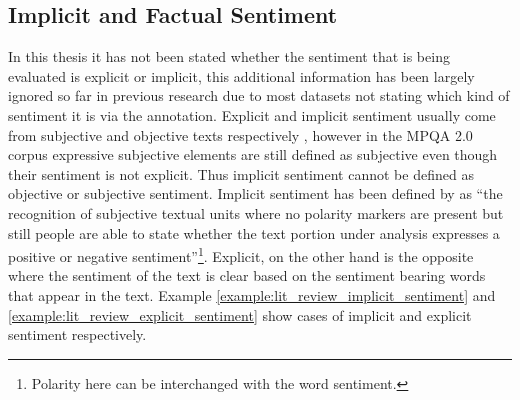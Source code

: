 
%
\subsection{Implicit and Factual Sentiment}
\label{lit_review_further_related_topics_implicit_and_factual_Sentiment}
In this thesis it has not been stated whether the sentiment that is being evaluated is explicit or implicit, this additional information has been largely ignored so far in previous research due to most datasets not stating which kind of sentiment it is via the annotation. Explicit and implicit sentiment usually come from subjective and objective texts respectively \citep{toprak-etal-2010-sentence, van2015good}, however in the MPQA 2.0 corpus \citep{wiebe2005annotating} expressive subjective elements are still defined as subjective even though their sentiment is not explicit. Thus implicit sentiment cannot be defined as objective or subjective sentiment. Implicit sentiment has been defined by \citep{russo-etal-2015-semeval} as ``the recognition of subjective textual units where no polarity markers are present but still people are able to state whether the text portion under analysis expresses a positive or negative sentiment''\footnote{Polarity here can be interchanged with the word sentiment.}. Explicit, on the other hand is the opposite where the sentiment of the text is clear based on the sentiment bearing words that appear in the text. Example \ref{example:lit_review_implicit_sentiment} and \ref{example:lit_review_explicit_sentiment} show cases of implicit and explicit sentiment respectively.


